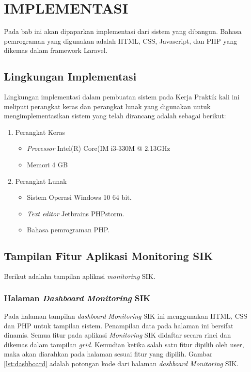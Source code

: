 \chapter{IMPLEMENTASI}
Pada bab ini akan dipaparkan implementasi dari sistem yang dibangun. Bahasa pemrograman yang digunakan adalah HTML, CSS, Javascript, dan PHP yang dikemas dalam framework Laravel.

\section{Lingkungan Implementasi}
\tab Lingkungan implementasi dalam pembuatan sistem pada Kerja Praktik kali ini meliputi perangkat keras dan perangkat lunak yang digunakan untuk mengimplementasikan sistem yang telah dirancang adalah sebagai berikut:
\begin{enumerate}
	\item Perangkat Keras
	\begin{itemize}
	\item \textit{Processor} Intel(R) Core(IM i3-330M @ 2.13GHz
	\item Memori 4 GB
	\end{itemize}
	\item Perangkat Lunak
	\begin{itemize}
	\item Sistem Operasi Windows 10 64 bit.
	\item \textit{Text editor} Jetbrains PHPstorm.
	\item Bahasa pemrograman PHP.
	\end{itemize}
\end{enumerate}

\section{Tampilan Fitur Aplikasi Monitoring SIK}
Berikut adalaha tampilan aplikasi \textit{monitoring} SIK.
\subsection{Halaman \textit{Dashboard} \textit{Monitoring} SIK}
Pada halaman tampilan \textit{dashboard Monitoring} SIK ini menggunakan HTML, CSS dan PHP untuk tampilan sistem. Penampilan data pada halaman ini bersifat dinamis. Semua fitur pada aplikasi \textit{Monitoring} SIK didaftar secara rinci dan dikemas dalam tampilan \textit{grid}. Kemudian ketika salah satu fitur dipilih oleh user, maka akan diarahkan pada halaman sesuai fitur yang dipilih. Gambar \ref{lst:dashboard} adalah potongan kode dari halaman \textit{dashboard Monitoring} SIK.

